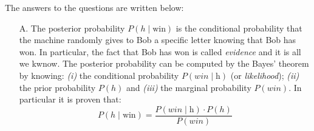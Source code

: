 The answers to the questions are written below:
\begin{itemize}
    \item[A.] The posterior probability $P(h\;|\;\text{win})$ is the conditional probability that the machine randomly gives to Bob
        a specific letter knowing that Bob has won. In particular, the fact that Bob has won is called \textit{evidence} and it is all
        we kwnow. The posterior probability can be computed by the Bayes' theorem by knowing: \textit{(i)} the conditional 
        probability $P(win\;|\;\text{h})$ (or \textit{likelihood}); \textit{(ii)} the prior probability $P(h)$ and 
        \textit{(iii)} the marginal probability $P(win)$.
        In particular it is proven that:
        \[ P(h\;|\;\text{win}) = \frac{P(win\;|\;\text{h}) \cdot P(h)}{P(win)}\]
    

\end{itemize}
